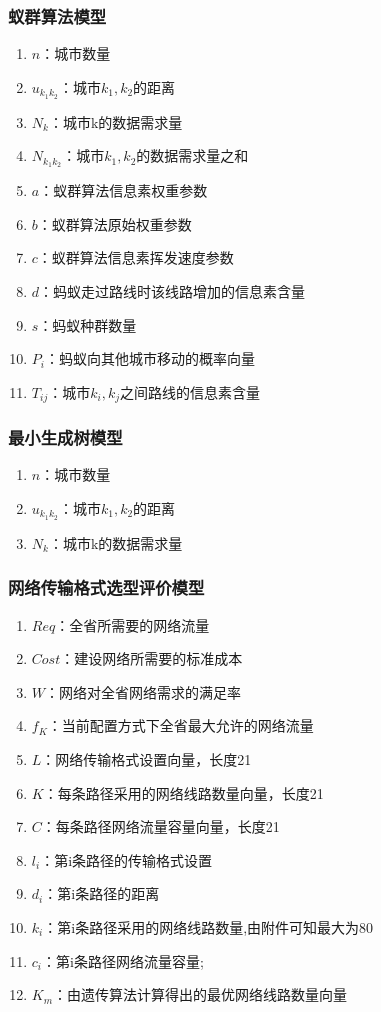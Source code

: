 \documentclass[UTF8,12pt]{ctexart}
\begin{document}
\subsubsection{蚁群算法模型}
\begin{enumerate}
    \item $n$：城市数量
    \item $u_{k_1k_2}$：城市$k_1,k_2$的距离
    \item $N_k$：城市k的数据需求量
    \item $N_{k_1k_2}$：城市$k_1,k_2$的数据需求量之和
    \item $a$：蚁群算法信息素权重参数
    \item $b$：蚁群算法原始权重参数
    \item $c$：蚁群算法信息素挥发速度参数
    \item $d$：蚂蚁走过路线时该线路增加的信息素含量
    \item $s$：蚂蚁种群数量
    \item $P_i$：蚂蚁向其他城市移动的概率向量
    \item $T_{ij}$：城市$k_i,k_j$之间路线的信息素含量
\end{enumerate}
\subsubsection{最小生成树模型}
\begin{enumerate}
    \item $n$：城市数量
    \item $u_{k_1k_2}$：城市$k_1,k_2$的距离
    \item $N_k$：城市k的数据需求量
\end{enumerate}
\subsubsection{网络传输格式选型评价模型}
\begin{enumerate}
    \item $Req$：全省所需要的网络流量
    \item $Cost$：建设网络所需要的标准成本
    \item $W$：网络对全省网络需求的满足率
    \item $f_K$：当前配置方式下全省最大允许的网络流量
    \item $L$：网络传输格式设置向量，长度21
    \item $K$：每条路径采用的网络线路数量向量，长度21
    \item $C$：每条路径网络流量容量向量，长度21
    \item $l_i$：第i条路径的传输格式设置
    \item $d_i$：第i条路径的距离
    \item $k_i$：第i条路径采用的网络线路数量,由附件可知最大为80
    \item $c_i$：第i条路径网络流量容量;
    \item $K_m$：由遗传算法计算得出的最优网络线路数量向量
\end{enumerate}
\end{document}
